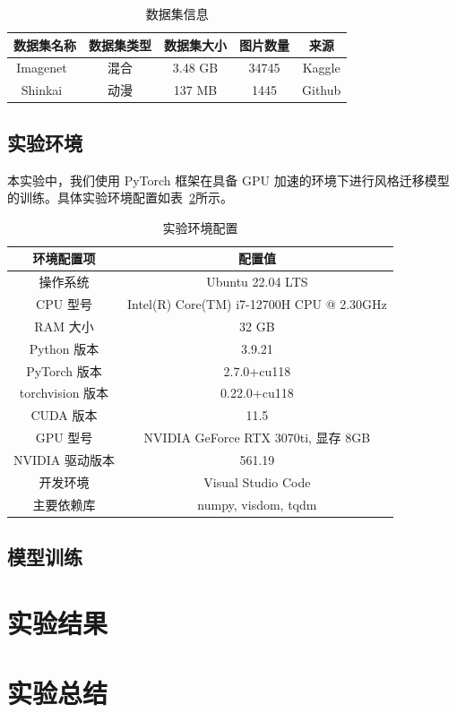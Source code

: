 \documentclass[UTF8,openany]{ctexbook}
\begin{document}
\begin{table}[H]
    \centering
    \caption{数据集信息}
    \label{tab:dataset}
    \begin{tabular}{ccccc}
        \toprule
        数据集名称 & 数据集类型 & 数据集大小 & 图片数量 & 来源 \\ \midrule
        Imagenet~\cite{deng2009imagenet}  & 混合 & 3.48 GB & 34745 & Kaggle   \\
        Shinkai~\cite{Liu2024dtgan}  & 动漫 & 137 MB & 1445 & Github  \\ \bottomrule
    \end{tabular}
\end{table}

\section{实验环境}
\label{sec:env}

本实验中，我们使用 PyTorch 框架在具备 GPU 加速的环境下进行风格迁移模型的训练。具体实验环境配置如表~\ref{tab:env}所示。

\begin{table}[H]
    \centering
    \caption{实验环境配置}
    \label{tab:env}
    \begin{tabular}{cc}
        \toprule
        环境配置项 & 配置值 \\ \midrule
        操作系统 & Ubuntu 22.04 LTS \\
        CPU 型号 & Intel(R) Core(TM) i7-12700H CPU @ 2.30GHz \\
        RAM 大小 & 32 GB \\
        Python 版本 & 3.9.21 \\
        PyTorch 版本 & 2.7.0+cu118 \\
        torchvision 版本 & 0.22.0+cu118 \\
        CUDA 版本 & 11.5 \\
        GPU 型号 & NVIDIA GeForce RTX 3070ti, 显存 8GB \\
        NVIDIA 驱动版本 & 561.19 \\ 
        开发环境 & Visual Studio Code \\ 
        主要依赖库 & numpy, visdom, tqdm \\ \bottomrule
    \end{tabular}
\end{table}

\section{模型训练}
\label{sec:model}



\chapter{实验结果}


\chapter{实验总结}



\end{document}
